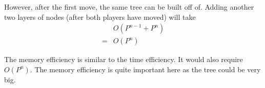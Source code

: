 \documentclass[12pt]{article}
\begin{document}
However, after the first move, the same tree can be built off of. Adding another two layers of nodes (after both players have moved) will take
\begin{align*}
&O(P^{n-1} + P^n) \\
= &O(P^n)
\end{align*}

The memory efficiency is similar to the time efficiency.  It would also require $O(P^n)$.  The memory efficiency is quite important here as the tree could be very big.
\end{document}
